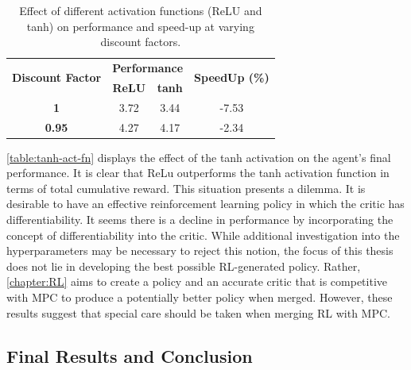 	
\begin{table}[h!]
	\centering
	\begin{tabular}{c c c c}
		\toprule
		\multirow{2}{*}{\textbf{Discount Factor}} & \multicolumn{2}{c}{\textbf{Performance}} & \multirow{2}{*}{\textbf{SpeedUp (\%)}} \\
		\cmidrule{2-3}
		& \textbf{ReLU} & \textbf{tanh} &  \\
		\midrule
		\textbf{1}   & 3.72 & 3.44 & -7.53 \\
		\textbf{0.95} & 4.27 & 4.17 & -2.34 \\
		\bottomrule
	\end{tabular}
	\caption{Effect of different activation functions (ReLU and tanh) on performance and speed-up at varying discount factors.}
	\label{table:tanh-act-fn}
\end{table}
	
\autoref{table:tanh-act-fn} displays the effect of the tanh activation on the agent’s final performance. It is clear that ReLu outperforms the tanh activation function in terms of total cumulative reward. This situation presents a dilemma. It is desirable to have an effective reinforcement learning policy in which the critic has differentiability. It seems there is a decline in performance by incorporating the concept of differentiability into the critic. While additional investigation into the hyperparameters may be necessary to reject this notion, the focus of this thesis does not lie in developing the best possible RL-generated policy. Rather, \autoref{chapter:RL} aims to create a policy and an accurate critic that is competitive with MPC to produce a potentially better policy when merged. However, these results suggest that special care should be taken when merging RL with MPC.

\subsection{Final Results and Conclusion}
\label{section:rl-deterministic-results}

